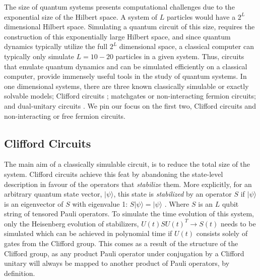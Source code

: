 

The size of quantum systems presents computational challenges due to the exponential size of the Hilbert space. A system of $L$ particles 
would have a $2^L$ dimensional Hilbert space. Simulating a quantum circuit of this size, requires the construction of this exponentially large 
Hilbert space, and since quantum dynamics typically utilize the full $2^L$ dimensional space, a classical computer can typically only simulate 
$L = 10-20$ particles in a given system. Thus, circuits that emulate quantum dynamics and can be simulated efficiently on a classical computer, provide
immensely useful tools in the study of quantum systems. In one dimensional systems, there are three known classically simulable or exactly solvable models; 
Clifford circuits \cite{knillGottesman}; matchgates \cite{Jozsa2008} or non-interacting fermion circuits\cite{Terhal2001}; and dual-unitary circuits \cite{Suzuki_2022}. We pin our focus on the first two, Clifford circuits and non-interacting or free fermion circuits.

\subsection{Clifford Circuits}

The main aim of a classically simulable circuit, is to reduce the total size of the system. Clifford circuits achieve this feat by 
abandoning the state-level description in favour of the operators that \textit{stabilize} them. More explicitly, for an arbitrary quantum 
state vector, $|\psi\rangle$, this state is \textit{stabilized} by an operator $S$ if $|\psi\rangle$ is an eigenvector of $S$ with eigenvalue 1: $S |\psi\rangle = |\psi\rangle$ \cite{stabilizercodes}.
Where $S$ is an $L$ qubit string of tensored Pauli operators. To simulate the time evolution of this system, only the Heisenberg evolution of stabilizers, $U(t)SU(t)^{T} \to S(t) $ needs to be simulated which can be achieved in polynomial time if $U(t)$ consists solely of gates from the Clifford group. This comes as a result of the structure of the Clifford group, as any product Pauli operator under conjugation by a Clifford unitary will always be mapped to another product of Pauli operators, by definition.

